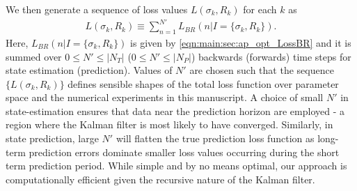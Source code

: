 We then generate a sequence of loss values $L(\sigma_k, R_k)$ for each $k$ as
\begin{align}
L(\sigma_k, R_k) \equiv  \sum_{n=1}^{N'} L_{BR}(n | I= \{\sigma_k, R_k \}).
\end{align}
Here, $L_{BR}(n | I= \{\sigma_k, R_k \})$ is given by \cref{eqn:main:sec:ap_opt_LossBR} and it is summed over $0\leq N'\leq |N_{T}|$  ($0\leq N'\leq |N_{P}|$) backwards (forwards) time steps for state estimation (prediction). Values of $N'$ are chosen such that the sequence $\{L(\sigma_k, R_k) \}$ defines sensible shapes of the total loss function over parameter space and the numerical experiments in this manuscript. A choice of small $N'$ in state-estimation ensures that data near the prediction horizon are employed - a region where the Kalman filter is most likely to have converged.  Similarly, in state prediction, large $N'$ will flatten the true prediction loss function as long-term prediction errors dominate smaller loss values occurring during the short term prediction period.  While simple and by no means optimal, our approach is computationally efficient given the recursive nature of the Kalman filter.%

